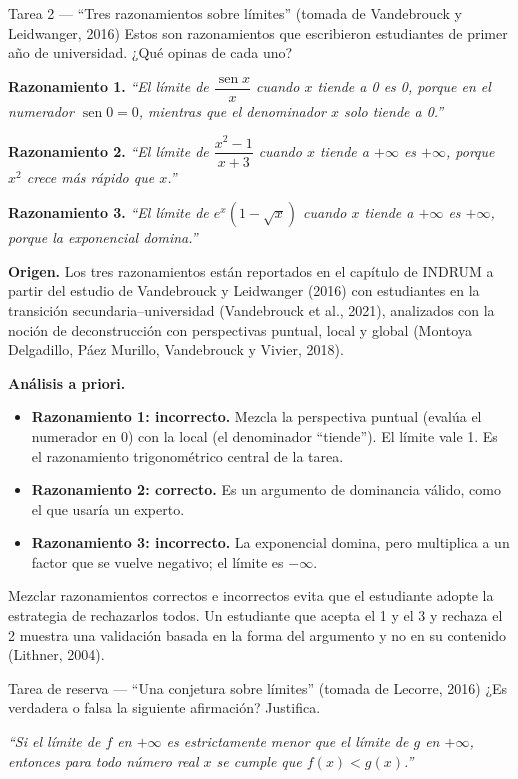 \documentclass[11pt,letterpaper]{article}
\begin{document}
\bigskip
\begin{tarea}{Tarea 2 --- ``Tres razonamientos sobre límites'' (tomada de Vandebrouck y Leidwanger, 2016)}
Estos son razonamientos que escribieron estudiantes de primer año de universidad. ¿Qué opinas de cada uno?

\medskip
\textbf{Razonamiento 1.} \emph{``El límite de $\dfrac{\operatorname{sen} x}{x}$ cuando $x$ tiende a 0 es 0, porque en el numerador $\operatorname{sen} 0 = 0$, mientras que el denominador $x$ solo tiende a 0.''}

\medskip
\textbf{Razonamiento 2.} \emph{``El límite de $\dfrac{x^2 - 1}{x + 3}$ cuando $x$ tiende a $+\infty$ es $+\infty$, porque $x^2$ crece más rápido que $x$.''}

\medskip
\textbf{Razonamiento 3.} \emph{``El límite de $e^{x}\left(1 - \sqrt{x}\right)$ cuando $x$ tiende a $+\infty$ es $+\infty$, porque la exponencial domina.''}
\end{tarea}

\noindent\textbf{Origen.} Los tres razonamientos están reportados en el capítulo de INDRUM a partir del estudio de Vandebrouck y Leidwanger (2016) con estudiantes en la transición secundaria--universidad (Vandebrouck et al., 2021), analizados con la noción de deconstrucción con perspectivas puntual, local y global (Montoya Delgadillo, Páez Murillo, Vandebrouck y Vivier, 2018).

\noindent\textbf{Análisis a priori.}
\begin{itemize}
  \item \textbf{Razonamiento 1: incorrecto.} Mezcla la perspectiva puntual (evalúa el numerador en 0) con la local (el denominador ``tiende''). El límite vale 1. Es el razonamiento trigonométrico central de la tarea.
  \item \textbf{Razonamiento 2: correcto.} Es un argumento de dominancia válido, como el que usaría un experto.
  \item \textbf{Razonamiento 3: incorrecto.} La exponencial domina, pero multiplica a un factor que se vuelve negativo; el límite es $-\infty$.
\end{itemize}
Mezclar razonamientos correctos e incorrectos evita que el estudiante adopte la estrategia de rechazarlos todos. Un estudiante que acepta el 1 y el 3 y rechaza el 2 muestra una validación basada en la forma del argumento y no en su contenido (Lithner, 2004).

\bigskip
\begin{tarea}{Tarea de reserva --- ``Una conjetura sobre límites'' (tomada de Lecorre, 2016)}
¿Es verdadera o falsa la siguiente afirmación? Justifica.

\emph{``Si el límite de $f$ en $+\infty$ es estrictamente menor que el límite de $g$ en $+\infty$, entonces para todo número real $x$ se cumple que $f(x) < g(x)$.''}
\end{tarea}
\end{document}
